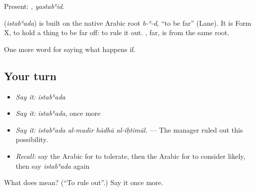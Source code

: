 Present: , \emph{yastabʿid}.

\begin{cousinweb}
\textbf{} (\emph{istabʿada}) is built on the native Arabic root \emph{b-ʿ-d}, \textquotedblleft{}to be far\textquotedblright{} (Lane). It is Form X, to hold a thing to be far off: to rule it out. , far, is from the same root.
\end{cousinweb}

\begin{grammarlens}[title={What you've built}]
One more word for saying what happens if.
\end{grammarlens}

\subsection*{Your turn}
\begin{itemize}
\raggedright
  \item \emph{Say it:} \emph{istabʿada}
  \item \emph{Say it:} \emph{istabʿada}, once more
  \item \emph{Say it:} \emph{istabʿada al-mudīr hādhā al-iḥtimāl.} — The manager ruled out this possibility.
  \item \emph{Recall:} say the Arabic for to tolerate, then the Arabic for to consider likely, then say \emph{istabʿada} again
\end{itemize}

\begin{tcolorbox}[breakable,colback=teal!4,colframe=teal!35!black,title={Before you move on}]
What does  mean? (\textquotedblleft{}To rule out\textquotedblright{}.) Say it once more.
\end{tcolorbox}
